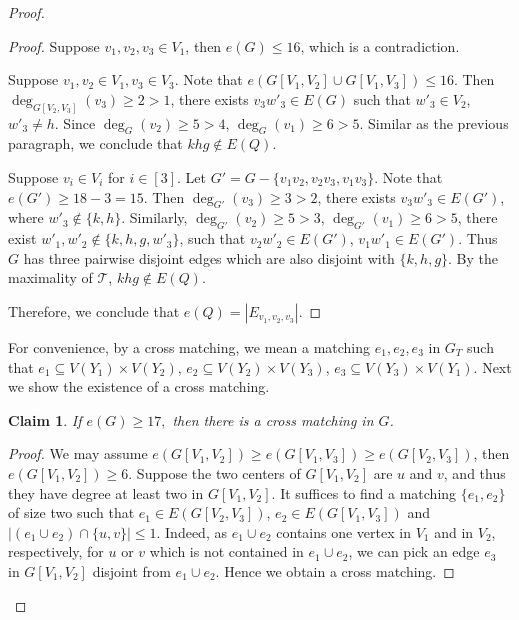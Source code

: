 \documentclass[11pt, reqno]{amsart}    	%
\newtheorem{claim}[thm]{Claim}
\theoremstyle{definition}
\def\cT{\mathcal T}
\numberwithin{equation}{section}
\begin{document}
\begin{proof}
\begin{proof}
				Suppose $ v_{1},v_{2},v_3\in V_1$, then $ e(G)\le16 $, which is a contradiction.
				
					Suppose $ v_{1},v_{2}\in V_1,v_{3}\in V_3$. Note that $ e(G[V_1,V_2]\cup G[V_1,V_3])\le 16$. Then $\deg_{G[V_2,V_3]}(v_{3})\ge2>1$,  there exists $v_{3}w'_{3}\in E(G)$ such that $w'_{3}\in V_{2}$, $w'_{3}\not=h$.  Since $\deg_{G}(v_{2})\ge5>4$, $\deg_{G}(v_{1})\ge6>5$. Similar as the previous paragraph, we conclude that $ khg\notin E(Q) $. 
				
			Suppose $ v_{i}\in V_i$ for $i\in [3]$.  Let $G'=G-\{v_{1}v_{2},v_{2}v_{3},v_{1}v_{3}\}$. Note that $ e(G')\ge 18-3=15$. Then $\deg_{G'}(v_{3})\ge3>2$,  there exists $v_{3}w'_{3}\in E(G')$, where $w'_{3}\notin \{ k,h\}$. Similarly,  $\deg_{G'}(v_{2})\ge5>3$, $\deg_{G'}(v_{1})\ge6>5$, there exist $ w'_{1},w'_{2} \notin \{ k,h,g,w'_{3}\}$, such that  $v_{2}w'_{2}\in E(G')$, $v_{1}w'_{1}\in E(G')$. Thus $G$ has three pairwise disjoint edges which are also disjoint with $\{k,h,g\}$. By the maximality of $\cT$, $ khg\notin E(Q) $.
			
		
			
		
			
			Therefore, we conclude that $e(Q)= |E_{v_{1},v_{2},v_{3}}|$.
		\end{proof}
		For convenience, by a cross matching, we mean a matching $e_1,e_2,e_3$ in $G_T$ such that  $e_1\subseteq V(Y_1) \times V(Y_2)$, $e_2\subseteq V(Y_2)\times V(Y_3)$, $e_3\subseteq V(Y_3)\times V(Y_1)$. 
		Next we show the existence of a cross matching.
		\begin{claim} \label{c3}
			If $e(G)\ge17,$ then there is a cross matching in $G$.
		\end{claim}
		\begin{proof}
			We may assume $e(G[V_{1},V_{2}])\ge e(G[V_{1},V_{3}])\ge e(G[V_{2},V_{3}])$, then $e(G[V_{1},V_{2}])\ge6.$  Suppose the two centers of $G[V_{1},V_{2}]$ are $u$ and $v$, and thus they have degree at least two in $G[V_{1},V_{2}]$. 
			It suffices to find a matching $\{e_1, e_2\}$ of size two such that $ e_1\in E(G[V_{2},V_{3}])$, $e_2\in E(G[V_{1},V_{3}])$ and $|( e_1\cup e_2)\cap\{u,v\}|\le1$.
			Indeed, as $e_1\cup e_2$ contains one vertex in $V_1$ and in $V_2$, respectively, for $u$ or $v$ which is not contained in $e_1\cup e_2$, we can pick an edge $e_3$ in $G[V_{1},V_{2}]$ disjoint from $e_1\cup e_2$.
		Hence we obtain a cross matching.
			

\end{proof}
\end{proof}
\end{document}
